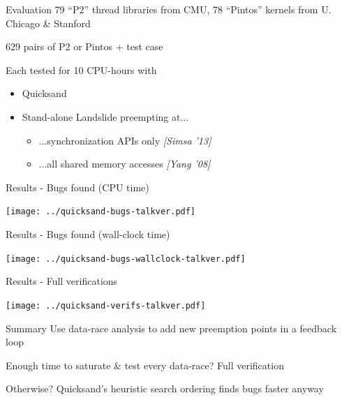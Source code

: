 \documentclass[xcolor=dvipsnames]{beamer}
\begin{document}
\begin{frame}{Evaluation}
	79 ``P2'' thread libraries from CMU, 78 ``Pintos'' kernels from U. Chicago \& Stanford
	\linegap

	629 pairs of P2 or Pintos + test case
	\linegap

	Each tested for 10 CPU-hours with
	\begin{itemize}
		\item Quicksand %
		\item Stand-alone Landslide %
			preempting at...
			\begin{itemize}
				\item ...synchronization APIs only {\em [Simsa '13]}
				\item ...all shared memory accesses
					{\em [Yang '08]} %
			\end{itemize}
	\end{itemize}
\end{frame}

\begin{frame}{Results - Bugs found (CPU time)}
	\begin{center}
		\texttt{[image: ../quicksand-bugs-talkver.pdf]}
	\end{center}
\end{frame}
\begin{frame}{Results - Bugs found (wall-clock time)}
	\begin{center}
		\texttt{[image: ../quicksand-bugs-wallclock-talkver.pdf]}
	\end{center}
\end{frame}
\begin{frame}{Results - Full verifications}
	\begin{center}
		\texttt{[image: ../quicksand-verifs-talkver.pdf]}
	\end{center}
\end{frame}

\begin{frame}{Summary}
	Use data-race analysis to add new preemption points in a feedback loop
	\linegap

	Enough time to saturate \& test every data-race? Full verification
	\linegap

	Otherwise? Quicksand's heuristic search ordering finds bugs faster anyway

\end{frame}
\end{document}
